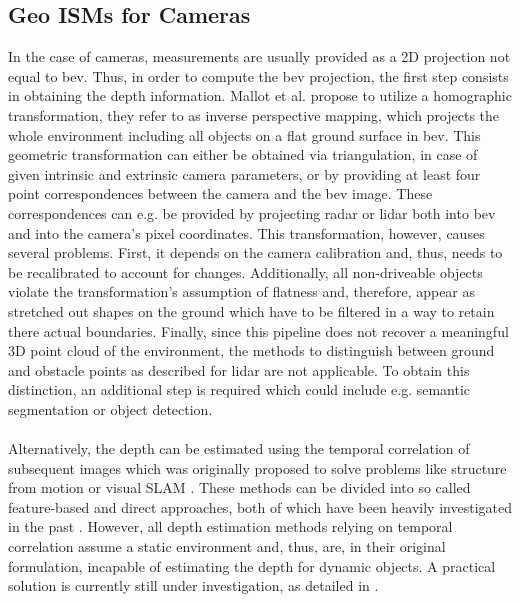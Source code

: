 \subsection{Geo ISMs for Cameras}
\label{subsec:geo_ism_camera}
In the case of cameras, measurements are usually provided as a 2D projection not equal to \gls{bev}. Thus, in order to compute the \gls{bev} projection, the first step consists in obtaining the depth information. Mallot et al. \cite{mallot1991inverse} propose to utilize a homographic transformation, they refer to as inverse perspective mapping, which projects the whole environment including all objects on a flat ground surface in \gls{bev}. This geometric transformation can either be obtained via triangulation, in case of given intrinsic and extrinsic camera parameters, or by providing at least four point correspondences between the camera and the \gls{bev} image. These correspondences can e.g. be provided by projecting radar or lidar both into \gls{bev} and into the camera's pixel coordinates. This transformation, however, causes several problems. First, it depends on the camera calibration and, thus, needs to be recalibrated to account for changes. Additionally, all non-driveable objects violate the transformation's assumption of flatness and, therefore, appear as stretched out shapes on the ground which have to be filtered in a way to retain there actual boundaries. Finally, since this pipeline does not recover a meaningful 3D point cloud of the environment, the methods to distinguish between ground and obstacle points as described for lidar are not applicable. To obtain this distinction, an additional step is required which could include e.g. semantic segmentation or object detection.
\\\\
Alternatively, the depth can be estimated using the temporal correlation of subsequent images which was originally proposed to solve problems like structure from motion \cite{longuet1981computer} or visual SLAM \cite{davison2007monoslam}. These methods can be divided into so called feature-based and direct approaches, both of which have been heavily investigated in the past \cite{ma2020image}. However, all depth estimation methods relying on temporal correlation assume a static environment and, thus, are, in their original formulation, incapable of estimating the depth for dynamic objects. A practical solution is currently still under investigation, as detailed in \cite{saputra2018visual}.
\\\\
